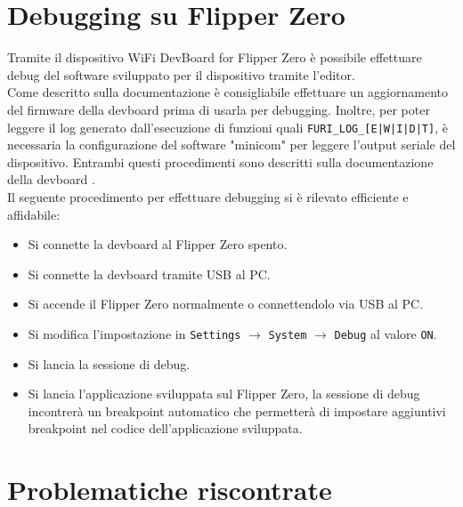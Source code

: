 \section{Debugging su Flipper Zero}
\label{sec:flip_dbg}

Tramite il dispositivo WiFi DevBoard for Flipper Zero è possibile effettuare debug del software sviluppato per il dispositivo tramite l'editor.\\
Come descritto sulla documentazione è consigliabile effettuare un aggiornamento del firmware della devboard prima di usarla per debugging. Inoltre, per poter leggere il log generato dall'esecuzione di funzioni quali \texttt{FURI\_LOG\_[E|W|I|D|T]}, è necessaria la configurazione del software "minicom" per leggere l'output seriale del dispositivo. Entrambi questi procedimenti sono descritti sulla documentazione della devboard \cite{devboard}.\\
Il seguente procedimento per effettuare debugging si è rilevato efficiente e affidabile:
\begin{itemize}
  \item Si connette la devboard al Flipper Zero spento.
  \item Si connette la devboard tramite USB al PC.
  \item Si accende il Flipper Zero normalmente o connettendolo via USB al PC.
  \item Si modifica l'impostazione in \texttt{Settings} \(\rightarrow\) \texttt{System} \(\rightarrow\) \texttt{Debug} al valore \texttt{ON}.
  \item Si lancia la sessione di debug.
  \item Si lancia l'applicazione sviluppata sul Flipper Zero, la sessione di debug incontrerà un breakpoint automatico che permetterà di impostare aggiuntivi breakpoint nel codice dell'applicazione sviluppata.
\end{itemize}

\section{Problematiche riscontrate}
\label{sec:flip_probs}

